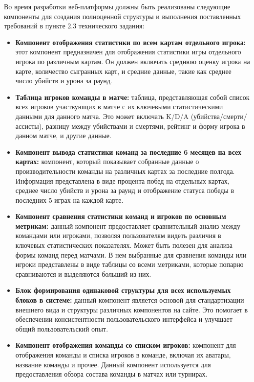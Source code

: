 Во время разработки веб-платформы должны быть реализованы следующие компоненты для создания полноценной структуры и выполнения поставленных требований в пункте 2.3 технического задания:
\begin{itemize}
	\item \textbf{Компонент отображения статистики по всем картам отдельного игрока:} этот компонент предназначен для отображения статистики игры отдельного игрока по различным картам. Он должен включать среднюю оценку игрока на карте, количество сыгранных карт,  и средние данные, такие как среднее число убийств и урона за раунд.
	\item \textbf{Таблица игроков команды в матче:} таблица, представляющая собой список всех игроков участвующих в матче с их ключевыми статистическими данными для данного матча. Это может включать K/D/A (убийства/смерти/ассисты), разницу между убийствами и смертями, рейтинг и форму игрока в данном матче, и другие данные.
	\item \textbf{Компонент вывода статистики команд за последние 6 месяцев на всех картах:} компонент, который показывает собранные данные о производительности команды на различных картах за последние полгода. Информация представлена в виде процента побед на отдельных картах, среднее число убийств и урона за раунд и отображение статуса победы в последних 5 играх на каждой карте.
	\item \textbf{Компонент сравнения статистики команд и игроков по основным метрикам:} данный компонент предоставляет сравнительный анализ между командами или игроками, позволяя пользователям видеть различия в ключевых статистических показателях. Может быть полезен для анализа формы команд перед матчами. В нем выбранные для сравнения команды или игроки представлены в виде таблицы со всеми метриками, которые попарно сравниваются и выделяются больший из них.
	\item \textbf{Блок формирования одинаковой структуры для всех используемых блоков в системе:} данный компонент является основой для стандартизации внешнего вида и структуры различных компонентов на сайте. Это помогает в обеспечении консистентности пользовательского интерфейса и улучшает общий пользовательский опыт.
	\item \textbf{Компонент отображения команды со списком игроков:} компонент для отображения команды и списка игроков в команде, включая их аватары, название команды и прочее. Данный компонент используется для предоставления обзора состава команды в матчах или турнирах.
\end{itemize}


